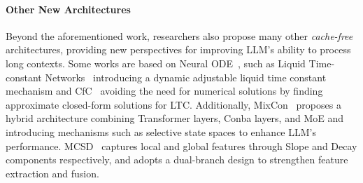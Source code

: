 \paragraph{Other New Architectures}
Beyond the aforementioned work, researchers also propose many other \textit{cache-free} architectures, providing new perspectives for improving LLM's ability to process long contexts. Some works are based on Neural ODE~\citep{chen2018neural}, such as Liquid Time-constant Networks~\citep{hasani2021liquid} introducing a dynamic adjustable liquid time constant mechanism and CfC~\citep{hasani2022closed} avoiding the need for numerical solutions by finding approximate closed-form solutions for LTC. Additionally, MixCon~\citep{xu2024mixcon} proposes a hybrid architecture combining Transformer layers, Conba layers, and MoE and introducing mechanisms such as selective state spaces to enhance LLM's performance. MCSD~\citep{yang2024mcsd} captures local and global features through Slope and Decay components respectively, and adopts a dual-branch design to strengthen feature extraction and fusion.